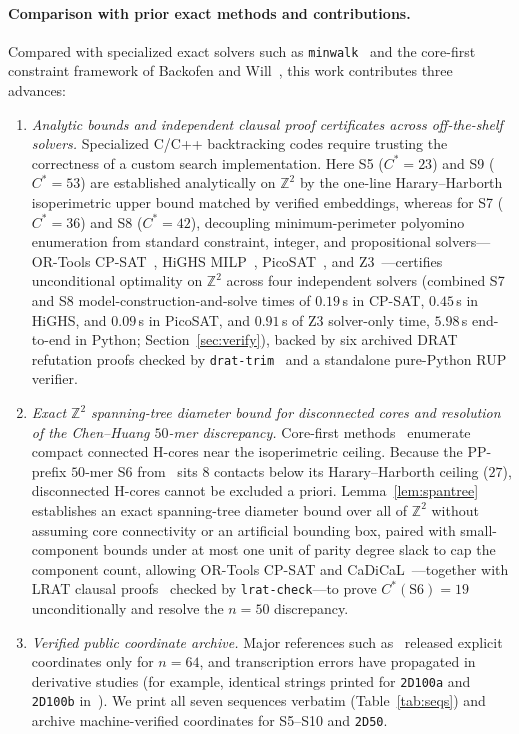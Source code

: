 \documentclass[11pt]{article}
\newcommand{\Z}{\mathbb{Z}}
\begin{document}
\paragraph{Comparison with prior exact methods and contributions.}
Compared with specialized exact solvers such as \texttt{minwalk}~\cite{giaquinta2013} and the core-first constraint framework of Backofen and Will~\cite{backofen2006,mann2008}, this work contributes three advances:
\begin{enumerate}[leftmargin=*,topsep=2pt,itemsep=1pt]
\item \emph{Analytic bounds and independent clausal proof certificates across off-the-shelf solvers.} Specialized C/C++ backtracking codes require trusting the correctness of a custom search implementation. Here S5 ($C^* = 23$) and S9 ($C^* = 53$) are established analytically on $\Z^2$ by the one-line Harary--Harborth isoperimetric upper bound matched by verified embeddings, whereas for S7 ($C^* = 36$) and S8 ($C^* = 42$), decoupling minimum-perimeter polyomino enumeration from standard constraint, integer, and propositional solvers---OR-Tools CP-SAT~\cite{perron2023}, HiGHS MILP~\cite{huangfu2018}, PicoSAT~\cite{biere2008}, and Z3~\cite{demoura2008}---certifies unconditional optimality on $\Z^2$ across four independent solvers (combined S7 and S8 model-construction-and-solve times of $0.19\,$s in CP-SAT, $0.45\,$s in HiGHS, and $0.09\,$s in PicoSAT, and $0.91\,$s of Z3 solver-only time, $5.98\,$s end-to-end in Python; Section~\ref{sec:verify}), backed by six archived DRAT refutation proofs checked by \texttt{drat-trim}~\cite{wetzler2014} and a standalone pure-Python RUP verifier.
\item \emph{Exact $\Z^2$ spanning-tree diameter bound for disconnected cores and resolution of the Chen--Huang $50$-mer discrepancy.} Core-first methods~\cite{backofen2006,mann2008} enumerate compact connected H-cores near the isoperimetric ceiling. Because the PP-prefix $50$-mer S6 from~\cite[Table~1]{chen2005} sits $8$ contacts below its Harary--Harborth ceiling ($27$), disconnected H-cores cannot be excluded a priori. Lemma~\ref{lem:spantree} establishes an exact spanning-tree diameter bound over all of $\Z^2$ without assuming core connectivity or an artificial bounding box, paired with small-component bounds under at most one unit of parity degree slack to cap the component count, allowing OR-Tools CP-SAT and CaDiCaL~\cite{biere2024}---together with LRAT clausal proofs~\cite{cruzfilipe2017} checked by \texttt{lrat-check}---to prove $C^*(\mathrm{S6}) = 19$ unconditionally and resolve the $n = 50$ discrepancy.
\item \emph{Verified public coordinate archive.} Major references such as~\cite{wust2012} released explicit coordinates only for $n = 64$, and transcription errors have propagated in derivative studies (for example, identical strings printed for \texttt{2D100a} and \texttt{2D100b} in~\cite{davis2016}). We print all seven sequences verbatim (Table~\ref{tab:seqs}) and archive machine-verified coordinates for S5--S10 and \texttt{2D50}.
\end{enumerate}
\end{document}
